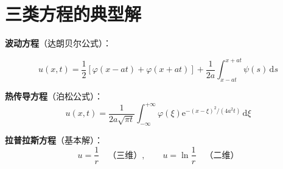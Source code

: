 \section{三类方程的典型解}

\textbf{波动方程}（达朗贝尔公式）：
\begin{zhongyao}[达朗贝尔公式]
\[
    u(x, t) = \frac{1}{2}[\varphi(x-at) + \varphi(x+at)] + \frac{1}{2a}\int_{x-at}^{x+at} \psi(s)\,\mathrm{d}s
\]
\end{zhongyao}

\textbf{热传导方程}（泊松公式）：
\begin{equation}
    u(x, t) = \frac{1}{2a\sqrt{\pi t}}\int_{-\infty}^{+\infty} \varphi(\xi)\mathrm{e}^{-(x-\xi)^2/(4a^2t)}\,\mathrm{d}\xi
\end{equation}

\textbf{拉普拉斯方程}（基本解）：
\begin{equation}
    u = \frac{1}{r} \quad \text{（三维）}, \qquad u = \ln\frac{1}{r} \quad \text{（二维）}
\end{equation}
